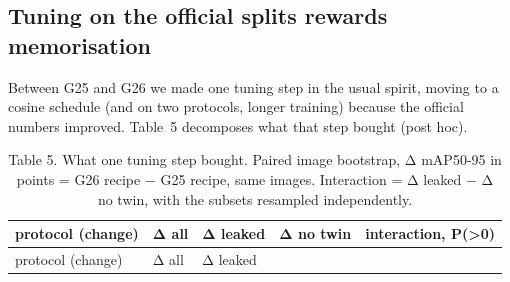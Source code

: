 \documentclass[
  10pt,
]{article}
\begin{document}
\subsection{Tuning on the official splits rewards
memorisation}\label{tuning-on-the-official-splits-rewards-memorisation}

Between G25 and G26 we made one tuning step in the usual spirit, moving
to a cosine schedule (and on two protocols, longer training) because the
official numbers improved. Table~5 decomposes what that step bought
(post hoc).

\begin{longtable}[]{@{}
  >{\raggedright\arraybackslash}p{}
  >{\raggedright\arraybackslash}p{}
  >{\raggedright\arraybackslash}p{}
  >{\raggedright\arraybackslash}p{}
  >{\raggedright\arraybackslash}p{}@{}}
\caption{Table 5. What one tuning step bought. Paired image bootstrap, Δ
mAP50-95 in points = G26 recipe − G25 recipe, same images. Interaction =
Δ leaked − Δ no twin, with the subsets resampled
independently.}\tabularnewline
\toprule\noalign{}
\begin{minipage}[b]{\linewidth}\raggedright
protocol (change)
\end{minipage} & \begin{minipage}[b]{\linewidth}\raggedright
Δ all
\end{minipage} & \begin{minipage}[b]{\linewidth}\raggedright
Δ leaked
\end{minipage} & \begin{minipage}[b]{\linewidth}\raggedright
Δ no twin
\end{minipage} & \begin{minipage}[b]{\linewidth}\raggedright
interaction, P(\textgreater0)
\end{minipage} \\
\midrule\noalign{}
\endfirsthead
\toprule\noalign{}
\begin{minipage}[b]{\linewidth}\raggedright
protocol (change)
\end{minipage} & \begin{minipage}[b]{\linewidth}\raggedright
Δ all
\end{minipage} & \begin{minipage}[b]{\linewidth}\raggedright
Δ leaked
\end{minipage} & \begin{minipage}[b]{\linewidth}\raggedright

\end{minipage}
\end{longtable}
\end{document}
